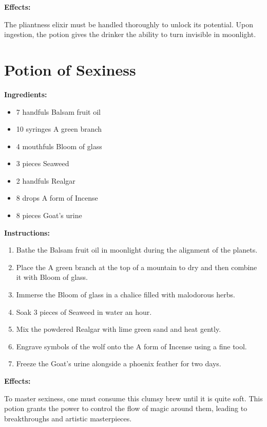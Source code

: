 \documentclass{article}
\begin{document}
\textbf{Effects:}

The pliantness elixir must be handled thoroughly to unlock its potential. Upon ingestion, the potion gives the drinker the ability to turn invisible in moonlight.

\newpage
\section*{Potion of Sexiness}

\textbf{Ingredients:}

\begin{itemize}
  \item 7 handfuls Balsam fruit oil
  \item 10 syringes A green branch
  \item 4 mouthfuls Bloom of glass
  \item 3 pieces Seaweed
  \item 2 handfuls Realgar
  \item 8 drops A form of Incense
  \item 8 pieces Goat's urine
\end{itemize}

\textbf{Instructions:}

\begin{enumerate}
  \item Bathe the Balsam fruit oil in moonlight during the alignment of the planets.
  \item Place the A green branch at the top of a mountain to dry and then combine it with Bloom of glass.
  \item Immerse the Bloom of glass in a chalice filled with malodorous herbs.
  \item Soak 3 pieces of Seaweed in water an hour.
  \item Mix the powdered Realgar with lime green sand and heat gently.
  \item Engrave symbols of the wolf onto the A form of Incense using a fine tool.
  \item Freeze the Goat's urine alongside a phoenix feather for two days.
\end{enumerate}

\textbf{Effects:}

To master sexiness, one must consume this clumsy brew until it is quite soft. This potion grants the power to control the flow of magic around them, leading to breakthroughs and artistic masterpieces.
\end{document}
